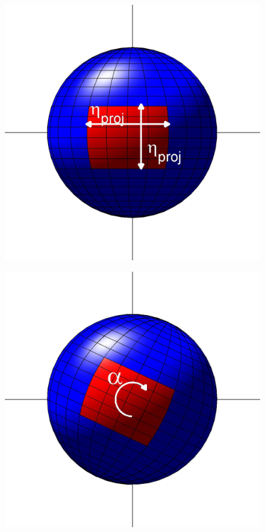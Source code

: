 \documentclass{pnastwo}
\begin{document}
\begin{figure}
\begin{minipage}{0.22\textwidth}
\centering
\includegraphics[width=\textwidth]{sphere2_1}\\
\end{minipage}
%
\hfill
%
\begin{minipage}{0.22\textwidth}
\centering
\includegraphics[width=\textwidth]{sphere2_2}\\

\end{minipage}
\end{figure}
\end{document}
